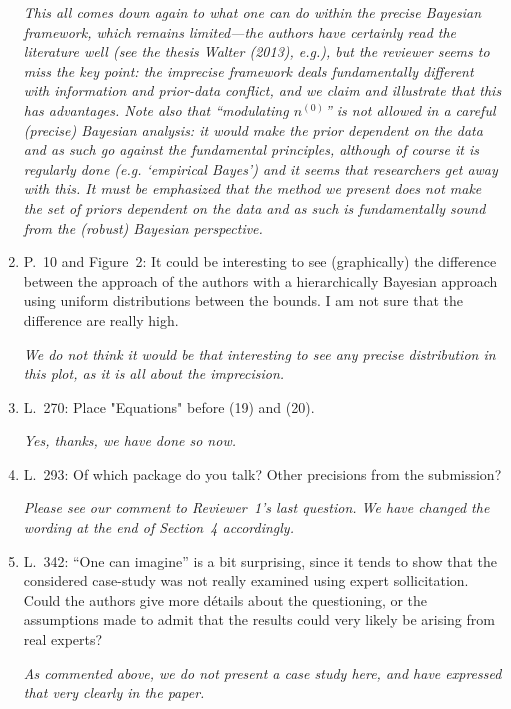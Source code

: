 \documentclass[Journal,SectionNumbers,SingleSpace,InsideFigs]{ascelike}
\newcommand{\uz}{^{(0)}} %
\def\nz{n\uz}
\begin{document}
\begin{enumerate}
\smallskip
\emph{This all comes down again to what one can do within the precise Bayesian framework,
which remains limited---the authors have certainly read the literature well (see the thesis Walter (2013), e.g.),
but the reviewer seems to miss the key point:
the imprecise framework deals fundamentally different with information and prior-data conflict,
and we claim and illustrate that this has advantages.
Note also that ``modulating $\nz$'' is not allowed in a careful (precise) Bayesian analysis:
it would make the prior dependent on the data and as such go against the fundamental principles,
although of course it is regularly done (e.g. `empirical Bayes') and it seems that researchers get away with this.
It must be emphasized that the method we present does not make the set of priors dependent on the data
and as such is fundamentally sound from the (robust) Bayesian perspective.}

\smallskip
\item P.~10 and Figure~2: It could be interesting to see (graphically) the difference between the approach of the authors
with a hierarchically Bayesian approach using uniform distributions between the bounds.
I am not sure that the difference are really high.

\smallskip
\emph{We do not think it would be that interesting to see any precise distribution in this plot, as it is all about the imprecision.}

\smallskip
\item L.~270: Place "Equations" before (19) and (20).

\smallskip
\emph{Yes, thanks, we have done so now.}

\smallskip
\item L.~293: Of which package do you talk? Other precisions from the submission?

\smallskip
\emph{Please see our comment to Reviewer~1's last question. We have changed the wording at the end of Section~4 accordingly.}

\smallskip
\item L.~342: ``One can imagine'' is a bit surprising,
since it tends to show that the considered case-study was not really examined using expert sollicitation.
Could the authors give more détails about the questioning,
or the assumptions made to admit that the results could very likely be arising from real experts?

\smallskip
\emph{As commented above, we do not present a case study here, and have expressed that very clearly in the paper.}


\end{enumerate}
\end{document}
